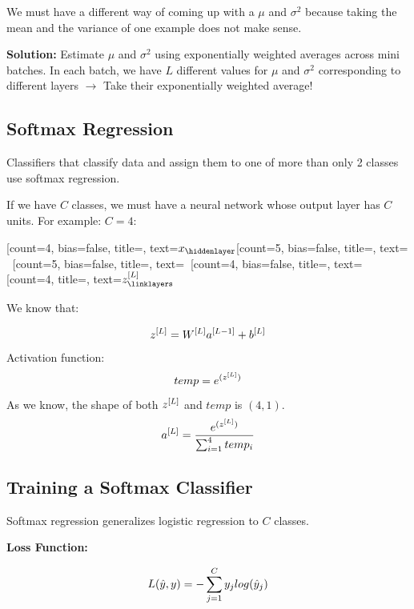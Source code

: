We must have a different way of coming up with a $\mu$ and $\sigma^2$ because taking the mean and the variance of one example does not make sense. 

\textbf{Solution:} Estimate $\mu$ and $\sigma^2$ using exponentially weighted averages across mini batches. 
In each batch, we have $L$ different values for $\mu$ and $\sigma^2$ corresponding to different layers $\rightarrow$ Take their exponentially weighted average!

\subsection{Softmax Regression}
Classifiers that classify data and assign them to one of more than only 2 classes use softmax regression. 

If we have $C$ classes, we must have a neural network whose output layer has $C$ units. For example: $C=4$: 


\begin{neuralnetwork}[]
    \newcommand{\x}[2]{$x_#2$}
    \newcommand{\y}[2]{$z\lay{L}_#2$}
    \newcommand{\hfirst}[2]{\small $\ $}
    \newcommand{\hsecond}[2]{\small $\ $}
    \newcommand{\hthird}[2]{\small $\ $}
    \newcommand{\hfourth}[2]{\small $\ $}

    [count=4, bias=false, title=, text=\x]
    \hiddenlayer[count=5, bias=false, title=, text=\hfirst] \linklayers
    \hiddenlayer[count=5, bias=false, title=, text=\hsecond] \linklayers
    \hiddenlayer[count=4, bias=false, title=, text=\hthird] \linklayers
    \outputlayer[count=4, title=, text=\y] \linklayers
\end{neuralnetwork}

We know that: 

$$
z^{[L]} = W^{[L]}a^{[L-1]} + b^{[L]}
$$
Activation function: 
$$
temp = e^{(z^{[L]})}
$$
As we know, the shape of both $z^{[L]}$ and $temp$ is $(4, 1)$.  
$$
a^{[L]} = \frac{e^{(z^{[L]})}}{\sum_{i=1}^{4} temp_i}
$$

\subsection{Training a Softmax Classifier}
Softmax regression generalizes logistic regression to $C$ classes. 

\textbf{Loss Function:}

$$
L(\hat{y}, y) = -\sum_{j=1}^{C} y_j log(\hat{y}_j)
$$
